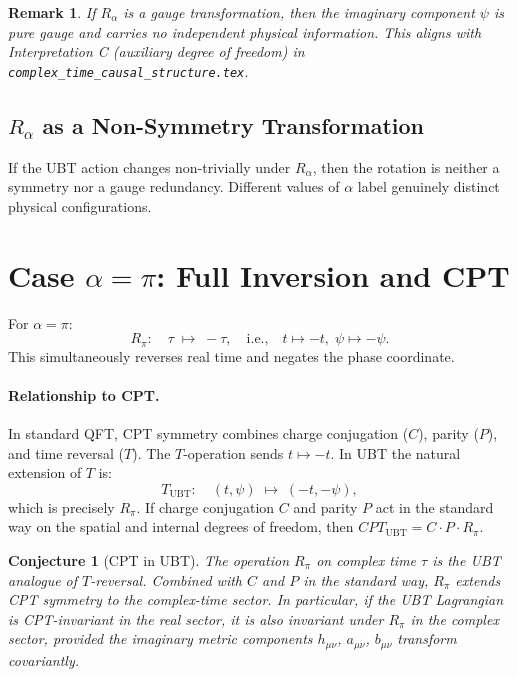 \documentclass[12pt]{article}
\newtheorem{conjecture}{Conjecture}
\newtheorem{remark}{Remark}
\begin{document}
\begin{remark}
If $R_\alpha$ is a gauge transformation, then the imaginary component
$\psi$ is pure gauge and carries no independent physical information.
This aligns with Interpretation C (auxiliary degree of freedom) in
\texttt{complex\_time\_causal\_structure.tex}.
\end{remark}

\subsection{$R_\alpha$ as a Non-Symmetry Transformation}
If the UBT action changes non-trivially under $R_\alpha$, then the
rotation is neither a symmetry nor a gauge redundancy.  Different values
of $\alpha$ label genuinely distinct physical configurations.

\section{Case $\alpha = \pi$: Full Inversion and CPT}
For $\alpha = \pi$:
\begin{equation}
  R_\pi:\quad \tau \;\mapsto\; -\tau, \quad
  \text{i.e.,}\quad t \mapsto -t,\; \psi \mapsto -\psi.
\end{equation}
This simultaneously reverses real time and negates the phase coordinate.

\paragraph{Relationship to CPT.}
In standard QFT, CPT symmetry combines charge conjugation ($C$), parity
($P$), and time reversal ($T$).  The $T$-operation sends $t \mapsto -t$.
In UBT the natural extension of $T$ is:
\begin{equation}
  T_{\mathrm{UBT}}:\quad (t,\psi) \;\mapsto\; (-t, -\psi),
\end{equation}
which is precisely $R_\pi$.  If charge conjugation $C$ and parity $P$
act in the standard way on the spatial and internal degrees of freedom,
then $CPT_{\mathrm{UBT}} = C \cdot P \cdot R_\pi$.

\begin{conjecture}[CPT in UBT]
\label{conj:cpt}
The operation $R_\pi$ on complex time $\tau$ is the UBT analogue of
$T$-reversal.  Combined with $C$ and $P$ in the standard way, $R_\pi$
extends CPT symmetry to the complex-time sector.  In particular, if
the UBT Lagrangian is CPT-invariant in the real sector, it is also
invariant under $R_\pi$ in the complex sector, provided the imaginary
metric components $h_{\mu\nu}$, $a_{\mu\nu}$, $b_{\mu\nu}$ transform
covariantly.
\end{conjecture}
\end{document}
